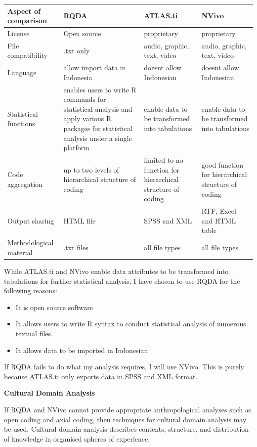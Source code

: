 \documentclass{article}
\begin{document}
\begin{tabu} to 1.0\textwidth { | X[l] | X[l] | X[l]| X[l]|}
 \hline
 \textbf{Aspect of comparison} & \textbf{RQDA} & \textbf{ATLAS.ti} & \textbf{NVivo} \\
 \hline
 License  & Open source  & proprietary & proprietary  \\
\hline
File compatibility & .txt only & audio, graphic, text, video & audio, graphic, text, video \\
\hline
Language & allow import data in Indonesia & doesnt allow Indonesian & doesnt allow Indonesian\\
\hline 
Statistical functions & enables users to write R commands for statistical analysis and apply various R packages for statistical analysis under a single platform & enable data to be transformed into tabulations & enable data to be transformed into tabulations\\
\hline
Code aggregation & up to two levels of hierarchical structure of coding & limited to no function for hierarchical structure of coding & good function for hierarchical structure of coding\\
\hline Output sharing & HTML file & SPSS and XML & RTF, Excel and HTML table \\
\hline 
Methodological material & .txt files & all file types & all file types\\
\hline
\end{tabu}

\setlength{\parindent}{0em}
\setlength{\parskip}{1em}

While ATLAS.ti and NVivo enable data attributes to be transformed into tabulations for further statistical analysis, I have chosen to use RQDA for the following reasons:
\begin{itemize}
    \item It is open source software
    \item It allows users to write R syntax to conduct statistical analysis of numerous textual files. 
    \item It allows data to be imported in Indonesian 
\end{itemize}

If RQDA fails to do what my analysis requires, I will use NVivo. This is purely because ATLAS.ti only exports data in SPSS and XML format.

\begin{center}
\textbf{Cultural Domain Analysis}
\end{center}
If RQDA and NVivo cannot provide appropriate anthropological analyses such as open coding and axial coding, then techniques for cultural domain analysis may be used. Cultural domain analysis describes contents, structure, and distribution of knowledge in organised spheres of experience.
\end{document}
